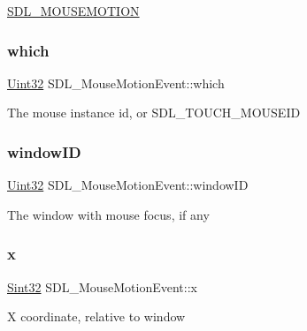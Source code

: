 \mbox{\hyperlink{_s_d_l__events_8h_a3b589e89be6b35c02e0dd34a55f3fccaa04c436ef80fef38fb77a89e0e9124c30}{S\+D\+L\+\_\+\+M\+O\+U\+S\+E\+M\+O\+T\+I\+ON}} \mbox{\label{struct_s_d_l___mouse_motion_event_a6f04c17b4305683915e2fd2dc3c36dbc}} 
\subsubsection{\texorpdfstring{which}{which}}
{\footnotesize\ttfamily \mbox{\hyperlink{_s_d_l__stdinc_8h_add440eff171ea5f55cb00c4a9ab8672d}{Uint32}} S\+D\+L\+\_\+\+Mouse\+Motion\+Event\+::which}

The mouse instance id, or S\+D\+L\+\_\+\+T\+O\+U\+C\+H\+\_\+\+M\+O\+U\+S\+E\+ID \mbox{\label{struct_s_d_l___mouse_motion_event_aa9976725242ada93a9e18e7fdf5796e6}} 
\subsubsection{\texorpdfstring{windowID}{windowID}}
{\footnotesize\ttfamily \mbox{\hyperlink{_s_d_l__stdinc_8h_add440eff171ea5f55cb00c4a9ab8672d}{Uint32}} S\+D\+L\+\_\+\+Mouse\+Motion\+Event\+::window\+ID}

The window with mouse focus, if any \mbox{\label{struct_s_d_l___mouse_motion_event_a36398bb4a5308446a262b0bfc8baa80a}} 
\subsubsection{\texorpdfstring{x}{x}}
{\footnotesize\ttfamily \mbox{\hyperlink{_s_d_l__stdinc_8h_a7a90b941db9d4582e9ad7abb9940ff7e}{Sint32}} S\+D\+L\+\_\+\+Mouse\+Motion\+Event\+::x}

X coordinate, relative to window \mbox{\label{struct_s_d_l___mouse_motion_event_a1c01d9aba2a20778fb45a15dca39ef58}} 
